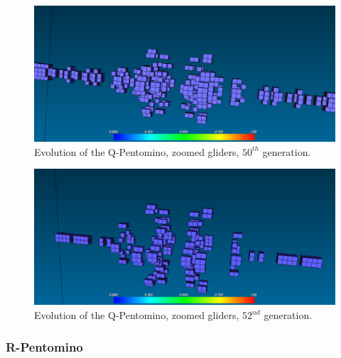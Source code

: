 \begin{figure}[H]
	\centering
	\includegraphics[scale=0.3]{pentominoes_ss/q_50_gliders.png}
	\caption{Evolution of the Q-Pentomino, zoomed gliders, $50^{th}$ generation.}
  \label{fig:ss-pent:q-50-gliders}
\end{figure}

\begin{figure}[H]
	\centering
	\includegraphics[scale=0.3]{pentominoes_ss/q_52_gliders.png}
	\caption{Evolution of the Q-Pentomino, zoomed gliders, $52^{nd}$ generation.}
  \label{fig:ss-pent:q-52-gliders}
\end{figure}

\subsubsection{R-Pentomino}
\label{sec:r-pentomino}

